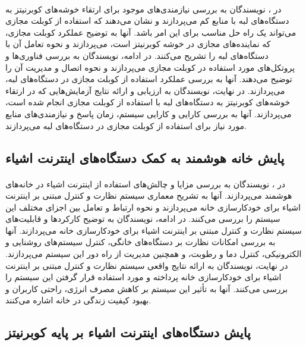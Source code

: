 \paragraph{}{
    در \cite{exteing-kubernetes-to-low-resource-edge-devices}،
    نویسندگان به بررسی نیازمندی‌های موجود برای ارتقاء خوشه‌های کوبرنیتز به دستگاه‌های لبه
    با منابع کم می‌پردازند و نشان می‌دهند که استفاده از کوبلت مجازی می‌تواند یک راه حل
    مناسب برای این امر باشد. آنها به توضیح عملکرد کوبلت مجازی، که نماینده‌های مجازی در
    خوشه کوبرنیتز است، می‌پردازند و نحوه تعامل آن با دستگاه‌های لبه را تشریح می‌کنند. در
    ادامه، نویسندگان به بررسی فناوری‌ها و پروتکل‌های مورد استفاده در کوبلت مجازی می‌پردازند
    و نحوه اتصال و مدیریت آن را توضیح می‌دهند. آنها به بررسی عملکرد استفاده از کوبلت مجازی 
    در دستگاه‌های لبه، می‌پردازند. در نهایت، نویسندگان به ارزیابی و ارائه نتایج آزمایش‌هایی
    که در ارتقاء خوشه‌های کوبرنیتز به دستگاه‌های لبه با استفاده از کوبلت مجازی انجام
    شده است، می‌پردازند. آنها به بررسی کارایی و کارایی سیستم، زمان پاسخ و نیازمندی‌های 
    منابع مورد نیاز برای استفاده از کوبلت مجازی در دستگاه‌های لبه می‌پردازند.
}

\subsection{
    پایش خانه هوشمند به کمک دستگاه‌های اینترنت اشیاء
}
\label{subsec:iot_based_monitoring}
\paragraph{}{
    در \cite{iot_based_monitoring}،
    نویسندگان به بررسی مزایا و چالش‌های استفاده از اینترنت اشیاء در خانه‌های هوشمند می‌پردازند.
    آنها به تشریح معماری سیستم نظارت و کنترل مبتنی بر اینترنت اشیاء برای خودکارسازی خانه
    می‌پردازند و نحوه ارتباط و تعامل بین اجزای مختلف این سیستم را بررسی می‌کنند. در ادامه، 
    نویسندگان به توضیح کارکردها و قابلیت‌های سیستم نظارت و کنترل مبتنی بر اینترنت اشیاء برای
    خودکارسازی خانه می‌پردازند. آنها به بررسی امکانات نظارت بر دستگاه‌های خانگی، کنترل سیستم‌های 
    روشنایی و الکترونیکی، کنترل دما و رطوبت، و همچنین مدیریت از راه دور این سیستم می‌پردازند. 
    در نهایت، نویسندگان به ارائه نتایج واقعی سیستم نظارت و کنترل مبتنی بر اینترنت اشیاء برای 
    خودکارسازی خانه پرداخته و مورد استفاده قرار گرفتن این سیستم را بررسی می‌کنند. آنها به تأثیر
    این سیستم بر کاهش مصرف انرژی، راحتی کاربران و بهبود کیفیت زندگی در خانه اشاره می‌کنند.
}

\subsection{
    پایش دستگاه‌های اینترنت اشیاء بر پایه کوبرنیتز
}
\label{subsec:iot_device_management}
